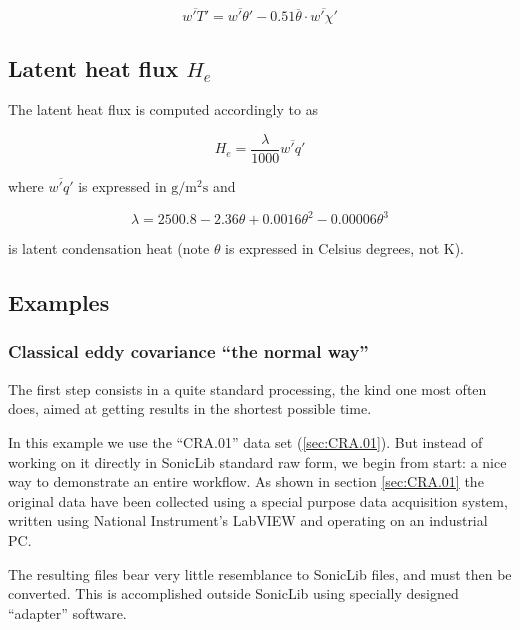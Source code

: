 \documentclass[a4paper,10pt]{book}
\begin{document}
\begin{equation}\label{eq:Schotanus correction simplified}
 \overline{w'T'} = \overline{w'\theta'} - 
    0.51 \overline{\theta} \cdot \overline{w'\chi'}
\end{equation} 

\subsection{Latent heat flux $H_{e}$}

The latent heat flux is computed accordingly to \cite{Sozzi2002} as

\begin{equation}\label{eq:Latent heat flux}
 H_{e} = \frac{\lambda}{1000} \overline{w'q'}
\end{equation} 

\noindent where $\overline{w'q'}$ is expressed in $\mbox{g}/\mbox{m}^2 \mbox{s}$ and

\begin{equation}\label{eq:Latent condensation heat}
 \lambda = 2500.8 - 2.36 \theta + 0.0016 \theta^2 - 0.00006 \theta^3
\end{equation} 

\noindent is latent condensation heat (note $\theta$ is expressed in Celsius degrees, not K).

\subsection{Examples}
\subsubsection{Classical eddy covariance ``the normal way''}

The first step consists in a quite standard processing, the kind one most often does, aimed at getting results in the shortest possible time.

In this example we use the ``CRA.01'' data set (\ref{sec:CRA.01}). But instead of working on it directly in SonicLib standard raw form, we begin from start: a nice way to demonstrate an entire workflow. As shown in section \ref{sec:CRA.01} the original data have been collected using a special purpose data acquisition system, written using National Instrument's LabVIEW and operating on an industrial PC.

The resulting files bear very little resemblance to SonicLib files, and must then be converted. This is accomplished outside SonicLib using specially designed ``adapter'' software.
\end{document}

